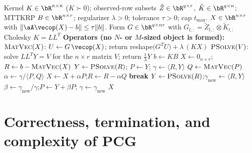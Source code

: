 \documentclass[12pt]{article}
\theoremstyle{definition}
\begin{document}
\begin{algorithm}[h]
\caption{Preconditioned CG (PCG) for the mode-$k$ RKHS subproblem}
\label{alg:pcg}
\begin{algorithmic}[1]
\Require Kernel $K\in\bR^{n\times n}$ ($K\succ0$); observed-row subsets
$\tilde Z\in\bR^{q\times r}$, $\tilde K\in\bR^{q\times n}$; MTTKRP
$B\in\bR^{n\times r}$; regularizer $\lambda>0$; tolerance $\tau>0$; cap $t_{\max}$.
\Ensure $X\in\bR^{n\times r}$ with $\|\aA\vecop(X)-b\|\le\tau\|b\|$.
\State Form $G\in\bR^{q\times nr}$ with $G_{l,:}=\tilde Z_{l,:}\otimes\tilde K_{l,:}$
\State Cholesky $K=LL^{T}$ 
\Statex \textbf{Operators (no $N$- or $M$-sized object is formed):}
\Statex \quad $\textsc{MatVec}(X)$: $U\gets G\,\vecop(X)$; \;
        return reshape$\big(G^{T}U\big)+\lambda\,(KX)$ 
\Statex \quad $\textsc{PSolve}(V)$: solve $LL^{T}Y=V$ for the $n\times r$ matrix $V$;
        return $\tfrac1\lambda Y$ 
\State $b\gets KB$ 
\State $X\gets 0_{n\times r}$;\; $R\gets b-\textsc{MatVec}(X)$ 
\State $Y\gets\textsc{PSolve}(R)$;\; $P\gets Y$;\; $\gamma\gets\langle R,Y\rangle$
  \State $Q\gets\textsc{MatVec}(P)$
  \State $\alpha\gets \gamma/\langle P,Q\rangle$
  \State $X\gets X+\alpha P$;\quad $R\gets R-\alpha Q$
   \textbf{break} \EndIf
  \State $Y\gets\textsc{PSolve}(R)$;\quad $\gamma_{\mathrm{new}}\gets\langle R,Y\rangle$
  \State $\beta\gets \gamma_{\mathrm{new}}/\gamma$;\quad $P\gets Y+\beta P$;\quad
         $\gamma\gets\gamma_{\mathrm{new}}$
\EndFor
\State \Return $X$
\end{algorithmic}
\end{algorithm}

\section{Correctness, termination, and complexity of PCG}
\end{document}
